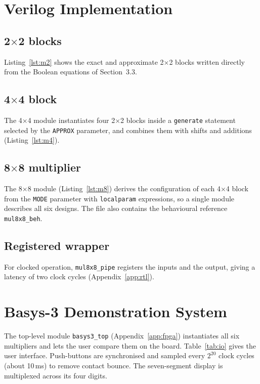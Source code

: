 \documentclass[12pt,a4paper,oneside]{report}
\begin{document}
\section{Verilog Implementation}
\subsection{2$\times$2 blocks}
Listing~\ref{lst:m2} shows the exact and approximate 2$\times$2 blocks written directly from the Boolean equations of Section~3.3.



\subsection{4$\times$4 block}
The 4$\times$4 module instantiates four 2$\times$2 blocks inside a \texttt{generate} statement selected by the \texttt{APPROX} parameter, and combines them with shifts and additions (Listing~\ref{lst:m4}).



\subsection{8$\times$8 multiplier}
The 8$\times$8 module (Listing~\ref{lst:m8}) derives the configuration of each 4$\times$4 block from the \texttt{MODE} parameter with \texttt{localparam} expressions, so a single module describes all six designs. The file also contains the behavioural reference \texttt{mul8x8\_beh}.



\subsection{Registered wrapper}
For clocked operation, \texttt{mul8x8\_pipe} registers the inputs and the output, giving a latency of two clock cycles (Appendix~\ref{app:rtl}).

\section{Basys-3 Demonstration System}
The top-level module \texttt{basys3\_top} (Appendix~\ref{app:fpga}) instantiates all six multipliers and lets the user compare them on the board. Table~\ref{tab:io} gives the user interface. Push-buttons are synchronised and sampled every $2^{20}$ clock cycles (about 10\,ms) to remove contact bounce. The seven-segment display is multiplexed across its four digits.
\end{document}
